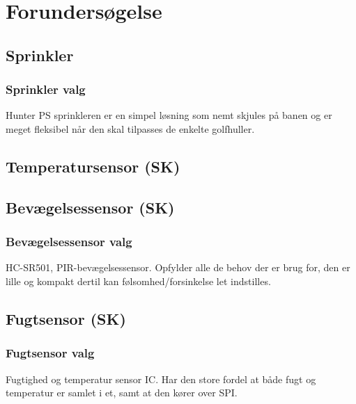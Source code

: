 \chapter{Forundersøgelse}

\section{Sprinkler}								%

\subsection{Sprinkler valg}						%
Hunter PS sprinkleren er en simpel løsning som nemt skjules på banen og er meget fleksibel når den skal tilpasses de enkelte golfhuller.
\clearpage
\section{Temperatursensor (SK)}						



\section{Bevægelsessensor (SK)}						

\subsection{Bevægelsessensor valg}				%
HC-SR501, PIR-bevægelsessensor. Opfylder alle de behov der er brug for, den er lille og kompakt dertil kan følsomhed/forsinkelse let indstilles.

\clearpage
\section{Fugtsensor (SK)}						

\subsection{Fugtsensor valg}						%
Fugtighed og temperatur sensor IC. Har den store fordel at både fugt og temperatur er samlet i et, samt at den kører over SPI. 